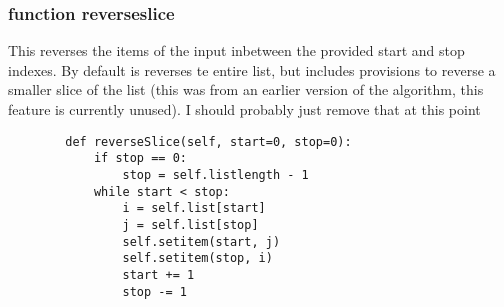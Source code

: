 \documentclass[12pt]{article}
\begin{document}
\subsubsection{function reverse\textunderscore slice}
This reverses the items of the input inbetween the provided start and stop indexes. By default is reverses te entire list, but includes provisions to reverse a smaller slice of the list (this was from an earlier version of the algorithm, this feature is currently unused). {\color{red}I should probably just remove that at this point}
\begin{lstlisting}
        def reverseSlice(self, start=0, stop=0):
            if stop == 0:
                stop = self.listlength - 1
            while start < stop:
                i = self.list[start]
                j = self.list[stop]
                self.setitem(start, j)
                self.setitem(stop, i)
                start += 1
                stop -= 1
      \end{lstlisting}
\pagebreak
\end{document}
